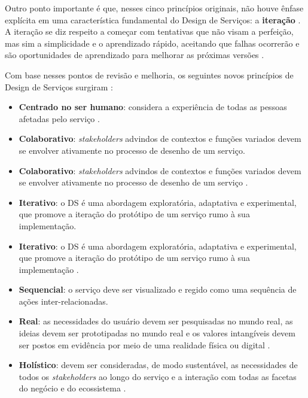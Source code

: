 Outro ponto importante é que, nesses cinco princípios originais, não houve ênfase explícita em uma característica fundamental do Design de Serviços: a \textbf{iteração} \cite{Stickdorn2019}. A iteração se diz respeito a começar com tentativas que não visam a perfeição, mas sim a simplicidade e o aprendizado rápido, aceitando que falhas ocorrerão e são oportunidades de aprendizado para melhorar as próximas versões \cite{kumar2023rheumatology}.

Com base nesses pontos de revisão e melhoria, os seguintes novos princípios de Design de Serviços surgiram \cite{Stickdorn2019}:

\begin{itemize}

	\item \textbf{Centrado no ser humano}: considera a experiência de todas as pessoas afetadas pelo serviço \cite{Stickdorn2019, Norman2016Applying, mager2023product}.
	
	\item \textbf{Colaborativo}: \textit{stakeholders} advindos de contextos e funções variados devem se envolver ativamente no processo de desenho de um serviço.
	
	\item \textbf{Colaborativo}: \textit{stakeholders} advindos de contextos e funções variados devem se envolver ativamente no processo de desenho de um serviço \cite{Stickdorn2019, iriarte2023service, milton2021eatingdisorders}.
	
	\item \textbf{Iterativo}: o DS é uma abordagem exploratória, adaptativa e experimental, que promove a iteração do protótipo de um serviço rumo à sua implementação.
	
	\item \textbf{Iterativo}: o DS é uma abordagem exploratória, adaptativa e experimental, que promove a iteração do protótipo de um serviço rumo à sua implementação \cite{Stickdorn2019, kumar2023rheumatology, paust2025integrative}.
	
	\item \textbf{Sequencial}: o serviço deve ser visualizado e regido como uma sequência de ações inter-relacionadas.
	
	\item \textbf{Real}: as necessidades do usuário devem ser pesquisadas no mundo real, as ideias devem ser prototipadas no mundo real e os valores intangíveis devem ser postos em evidência por meio de uma realidade física ou digital \cite{Stickdorn2019, mager2023product, asbjornsen2022echange, lambe2022capabilities}.
	
	\item \textbf{Holístico}: devem ser consideradas, de modo sustentável, as necessidades de todos os \textit{stakeholders} ao longo do serviço e a interação com todas as facetas do negócio e do ecossistema \cite{Stickdorn2019, Tolle2024Vink, lee2022how}.
\end{itemize}

